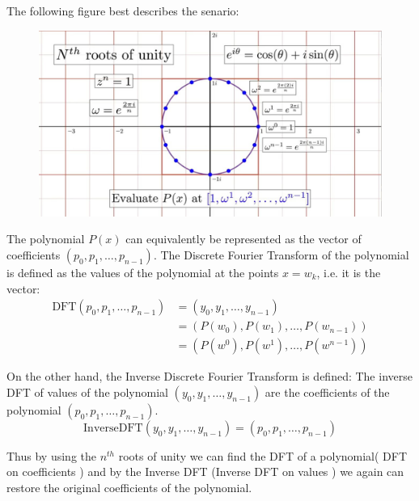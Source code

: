 \documentclass[28pt]{report}
\begin{document}
              The following figure best describes the senario:

               \begin{figure}[H]
               \centering
               \includegraphics[width=1\textwidth]{Images/nthroot.jpg}
               
               \label{fig:enter-label}
               \end{figure}

              The polynomial $P(x)$ can equivalently be represented as the vector of coefficients $(p_0, p_1, \dots, p_{n-1})$. The Discrete Fourier Transform of the polynomial is defined as the values of the polynomial at the points $x = w_{k}$, i.e. it is the vector: \\

                \begin{align*} \text{DFT}(p_0, p_1, \dots, p_{n-1}) &= (y_0, y_1, \dots, y_{n-1}) \\ &= (P(w_{0}), P(w_{1}), \dots, P(w_{n-1})) \\ &= (P(w^0), P(w^1), \dots, P(w^{n-1})) \end{align*}
                \pagebreak

            On the other hand,  the Inverse Discrete Fourier Transform is defined: The inverse DFT of values of the polynomial $(y_0, y_1, \dots, y_{n-1})$ are the coefficients of the polynomial $(p_0, p_1, \dots, p_{n-1})$.
            $$\text{InverseDFT}(y_0, y_1, \dots, y_{n-1}) = (p_0, p_1, \dots, p_{n-1})$$

            Thus by using the $n^{th}$ roots of unity we can find the DFT of a polynomial( DFT on coefficients ) and by the Inverse DFT (Inverse DFT on values ) we again can restore the original coefficients of the polynomial.
            \\
            
\end{document}
